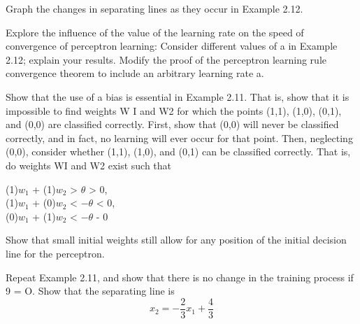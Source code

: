 \begin{problem}[7]
Graph the changes in separating lines as they occur in Example 2.12.
\solution

\end{problem}

\begin{problem}[8]
Explore the influence of the value of the learning rate on the speed of convergence
of perceptron learning:
\ppart Consider different values of a in Example 2.12; explain your results.
\ppart Modify the proof of the perceptron learning rule convergence theorem to include
an arbitrary learning rate a.
\solution

\end{problem}

\begin{problem}[9]
 Show that the use of a bias is essential in Example 2.11. That is, show that it is
impossible to find weights W I and W2 for which the points (1,1), (1,0), (0,1), and (0,0)
are classified correctly. First, show that (0,0) will never be classified correctly, and
in fact, no learning will ever occur for that point. Then, neglecting (0,0), consider
whether (1,1), (1,0), and (0,1) can be classified correctly. That is, do weights WI and
W2 exist such that
\begin{center}
(1)$w_1$ + (1)$w_2$ > $\theta $ > 0,\\
(1)$w_1$ + (0)$w_2$ < $-\theta $ < 0,\\
(0)$w_1$ + (1)$w_2$ < $-\theta $ - 0
\end{center}
\solution

\end{problem}

\begin{problem}[10]
Show that small initial weights still allow for any position of the initial decision line
for the perceptron.

\solution

\end{problem}

\begin{problem}[11]
 Repeat Example 2.11, and show that there is no change in the training process if
9 = O. Show that the separating line is
\[x_2=-\frac{2}{3}x_1+\frac{4}{3}\]
\solution

\end{problem}


